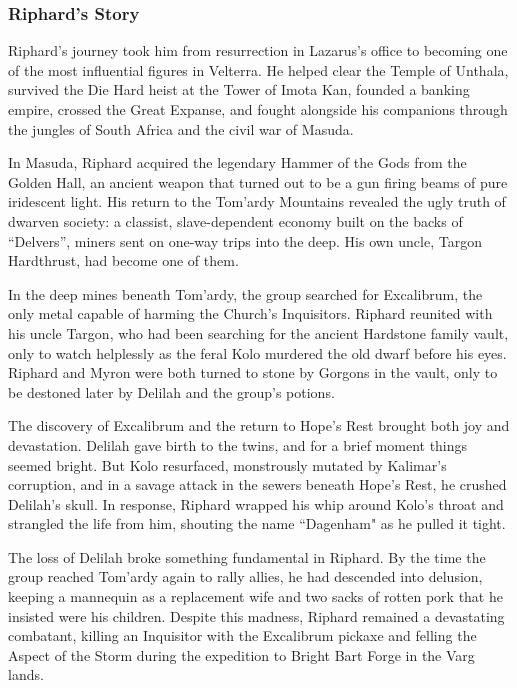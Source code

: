 \subsubsection{Riphard's Story}

Riphard's journey took him from resurrection in Lazarus's office to becoming one of the most influential figures in Velterra.  He helped clear the Temple of Unthala, survived the Die Hard heist at the Tower of Imota Kan, founded a banking empire, crossed the Great Expanse, and fought alongside his companions through the jungles of South Africa and the civil war of Masuda.

In Masuda, Riphard acquired the legendary Hammer of the Gods from the Golden Hall, an ancient weapon that turned out to be a gun firing beams of pure iridescent light.  His return to the Tom'ardy Mountains revealed the ugly truth of dwarven society: a classist, slave-dependent economy built on the backs of ``Delvers'', miners sent on one-way trips into the deep.  His own uncle, Targon Hardthrust, had become one of them.

In the deep mines beneath Tom'ardy, the group searched for Excalibrum, the only metal capable of harming the Church's Inquisitors.  Riphard reunited with his uncle Targon, who had been searching for the ancient Hardstone family vault, only to watch helplessly as the feral Kolo murdered the old dwarf before his eyes.  Riphard and Myron were both turned to stone by Gorgons in the vault, only to be destoned later by Delilah and the group's potions.

The discovery of Excalibrum and the return to Hope's Rest brought both joy and devastation.  Delilah gave birth to the twins, and for a brief moment things seemed bright.  But Kolo resurfaced, monstrously mutated by Kalimar's corruption, and in a savage attack in the sewers beneath Hope's Rest, he crushed Delilah's skull.  In response, Riphard wrapped his whip around Kolo's throat and strangled the life from him, shouting the name ``Dagenham" as he pulled it tight.

The loss of Delilah broke something fundamental in Riphard.  By the time the group reached Tom'ardy again to rally allies, he had descended into delusion, keeping a mannequin as a replacement wife and two sacks of rotten pork that he insisted were his children.  Despite this madness, Riphard remained a devastating combatant, killing an Inquisitor with the Excalibrum pickaxe and felling the Aspect of the Storm during the expedition to Bright Bart Forge in the Varg lands.

